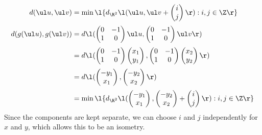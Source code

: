 \documentclass[a4paper]{article}
\begin{document}
\begin{align*}
d(\ul u, \ul v) &= \min\l\{ d_{\R^2} \l( \ul u, \ul v + \begin{pmatrix} i \\ j \end{pmatrix} \r)
    : i, j \in \Z \r\} \\[0.5ex]
%
d(g(\ul u), g(\ul v)) &= d \l(
    \begin{pmatrix} 0 & -1 \\ 1 & 0 \end{pmatrix} \ul u,
    \begin{pmatrix} 0 & -1 \\ 1 & 0 \end{pmatrix} \ul v
\r) \\[0.5ex]
%
&= d \l(
    \begin{pmatrix} 0 & -1 \\ 1 & 0 \end{pmatrix} \begin{pmatrix} x_1 \\ y_1 \end{pmatrix},
    \begin{pmatrix} 0 & -1 \\ 1 & 0 \end{pmatrix} \begin{pmatrix} x_2 \\ y_2 \end{pmatrix}
\r) \\[0.5ex]
%
&= d \l(
    \begin{pmatrix} -y_1 \\ x_1 \end{pmatrix},
    \begin{pmatrix} -y_2 \\ x_2 \end{pmatrix}
\r) \\[0.5ex]
%
&= \min\l\{ d_{\R^2} \l(
    \begin{pmatrix} -y_1 \\ x_1 \end{pmatrix},
    \begin{pmatrix} -y_2 \\ x_2 \end{pmatrix} + \begin{pmatrix} i \\ j \end{pmatrix}
\r) : i, j \in \Z \r\}
\end{align*}
Since the components are kept separate, we can choose $i$ and $j$ independently for $x$ and $y$, which allows this to be an isometry.
\end{document}

